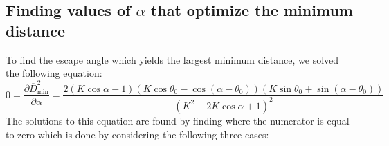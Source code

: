 \documentclass[12pt]{article}
\def\d{\partial}
\newcommand{\ol}{\overline}
\begin{document}
\newpage
\subsection{Finding values of $\alpha$ that optimize the minimum distance}

To find the escape angle which yields the largest minimum distance, we solved the following equation:
%
\begin{equation}
0 = \frac{\d \ol{D}^2_{\text{min}}}{\d \alpha} = 
\frac{2(K \cos \alpha - 1)(K\cos \theta_0 - \cos(\alpha - \theta_0))(K\sin \theta_0 + \sin(\alpha -\theta_0))}
{(K^2 - 2K \cos \alpha + 1)^2}
\end{equation} 
%
The solutions to this equation are found by finding where the numerator is equal to zero which is done by considering the following three cases:
%
\end{document}

